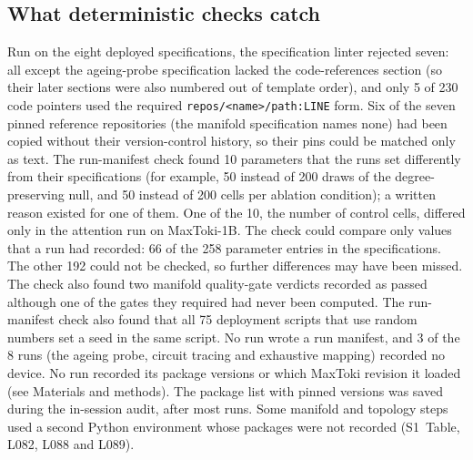 \subsection*{What deterministic checks catch}
Run on the eight deployed specifications, the specification linter
rejected seven: all except the ageing-probe specification lacked the
code-references section (so their later sections were also numbered out
of template order), and only 5 of 230 code pointers used the required
\texttt{repos/<name>/path:LINE} form. Six of the seven pinned reference
repositories (the manifold specification names none) had been copied
without their version-control history, so their pins could be matched
only as text. The run-manifest check found 10 parameters that the runs
set differently from their specifications (for example, 50 instead of
200 draws of the degree-preserving null, and 50 instead of 200 cells per
ablation condition); a written reason existed for one of them. One of
the 10, the number of control cells, differed only in the attention run
on MaxToki-1B. The check could compare only values that a run had
recorded: 66 of the 258 parameter entries in the specifications. The
other 192 could not be checked, so further differences may have been
missed. The check also found two manifold quality-gate verdicts recorded
as passed although one of the gates they required had never been
computed. The run-manifest check also found that all 75 deployment
scripts that use random numbers set a seed in the same script. No run
wrote a run manifest, and 3 of the 8 runs (the ageing probe, circuit
tracing and exhaustive mapping) recorded no device. No run recorded its
package versions or which MaxToki revision it loaded (see Materials and
methods). The package list with pinned versions was saved during the
in-session audit, after most runs. Some manifold and topology steps used
a second Python environment whose packages were not recorded (S1~Table,
L082, L088 and L089).

